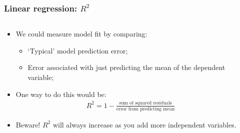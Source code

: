 \documentclass[aspectratio=169]{beamer}
\theoremstyle{principle}
\begin{document}
\begin{frame}
\frametitle{Linear regression: $R^2$}

\begin{columns}
\begin{column}{0.5\textwidth}

\begin{itemize}
\item We could measure model fit by comparing:
\begin{itemize}
\item `Typical' model prediction error;
\item Error associated with just predicting the mean of the dependent variable;
 \end{itemize}
\bigskip

\item One way to do this would be:
\begin{align*}
R^2 = 1 - \frac{\mbox{sum of squared residuals}}{\mbox{error from predicting mean}}
\end{align*}

\item[] \color{white}Beware!  $R^2$ will always increase as you add more independent variables.
\end{itemize}

\end{column}
\begin{column}{0.5\textwidth}



\end{column}
\end{columns}

\end{frame}
\end{document}
